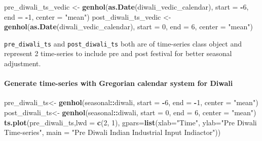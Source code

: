 \documentclass[
]{article}
\newenvironment{Shaded}{\begin{snugshade}}{\end{snugshade}}
\newcommand{\AttributeTok}[1]{\textcolor[rgb]{0.13,0.29,0.53}{#1}}
\newcommand{\DecValTok}[1]{\textcolor[rgb]{0.00,0.00,0.81}{#1}}
\newcommand{\FunctionTok}[1]{\textcolor[rgb]{0.13,0.29,0.53}{\textbf{#1}}}
\newcommand{\NormalTok}[1]{#1}
\newcommand{\OtherTok}[1]{\textcolor[rgb]{0.56,0.35,0.01}{#1}}
\newcommand{\SpecialCharTok}[1]{\textcolor[rgb]{0.81,0.36,0.00}{\textbf{#1}}}
\newcommand{\StringTok}[1]{\textcolor[rgb]{0.31,0.60,0.02}{#1}}
\begin{document}
\begin{Shaded}
\begin{Highlighting}[]
\NormalTok{pre\_diwali\_ts\_vedic }\OtherTok{\textless{}{-}} \FunctionTok{genhol}\NormalTok{(}\FunctionTok{as.Date}\NormalTok{(diwali\_vedic\_calendar), }\AttributeTok{start =} \SpecialCharTok{{-}}\DecValTok{6}\NormalTok{, }\AttributeTok{end =} \SpecialCharTok{{-}}\DecValTok{1}\NormalTok{, }\AttributeTok{center =} \StringTok{"mean"}\NormalTok{)}
\NormalTok{post\_diwali\_ts\_vedic }\OtherTok{\textless{}{-}} \FunctionTok{genhol}\NormalTok{(}\FunctionTok{as.Date}\NormalTok{(diwali\_vedic\_calendar), }\AttributeTok{start =} \DecValTok{0}\NormalTok{, }\AttributeTok{end =} \DecValTok{6}\NormalTok{, }\AttributeTok{center =} \StringTok{"mean"}\NormalTok{)}
\end{Highlighting}
\end{Shaded}

\texttt{pre\_diwali\_ts} and \texttt{post\_diwali\_ts} both are of
time-series class object and represent 2 time-series to include pre and
post festival for better seasonal adjustment.

\hypertarget{generate-time-series-with-gregorian-calendar-system-for-diwali}{%
\paragraph{Generate time-series with Gregorian calendar system for
Diwali}\label{generate-time-series-with-gregorian-calendar-system-for-diwali}}

\begin{Shaded}
\begin{Highlighting}[]
\NormalTok{pre\_diwali\_ts}\OtherTok{\textless{}{-}} \FunctionTok{genhol}\NormalTok{(seasonal}\SpecialCharTok{::}\NormalTok{diwali, }\AttributeTok{start =} \SpecialCharTok{{-}}\DecValTok{6}\NormalTok{, }\AttributeTok{end =} \SpecialCharTok{{-}}\DecValTok{1}\NormalTok{, }\AttributeTok{center =} \StringTok{"mean"}\NormalTok{)}
\NormalTok{post\_diwali\_ts}\OtherTok{\textless{}{-}} \FunctionTok{genhol}\NormalTok{(seasonal}\SpecialCharTok{::}\NormalTok{diwali, }\AttributeTok{start =} \DecValTok{0}\NormalTok{, }\AttributeTok{end =} \DecValTok{6}\NormalTok{, }\AttributeTok{center =} \StringTok{"mean"}\NormalTok{)}
\FunctionTok{ts.plot}\NormalTok{(pre\_diwali\_ts,}\AttributeTok{lwd =} \FunctionTok{c}\NormalTok{(}\DecValTok{2}\NormalTok{, }\DecValTok{1}\NormalTok{),  }\AttributeTok{gpars=}\FunctionTok{list}\NormalTok{(}\AttributeTok{xlab=}\StringTok{"Time"}\NormalTok{, }\AttributeTok{ylab=}\StringTok{"Pre Diwali Time{-}series"}\NormalTok{, }\AttributeTok{main =} \StringTok{"Pre Diwali Indian Industrial Input Indiactor"}\NormalTok{))}
\end{Highlighting}
\end{Shaded}
\end{document}

